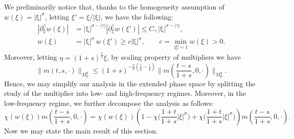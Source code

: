 \documentclass[10pt]{article}
\newcommand{\xii}{{\mathrm{|\xi|}}}
\newcommand{\<}{\langle}
\renewcommand{\>}{\rangle}
\numberwithin{equation}{section}
\begin{document}
We preliminarily notice that, thanks to the homogeneity assumption of $w(\xi) =\xii^\sigma$, letting $\xi'=\xi/\xii$, we have the following:
%
\begin{align*}
|\partial_\xi^\gamma w(\xi)| & = \xii^{\sigma-|\gamma|} |\partial_\xi^\gamma w(\xi')| \leq C_\gamma\,\xii^{\sigma-|\gamma|},\\
w(\xi) & =\xii^\sigma\,w(\xi')\geq c\xii^\sigma, \qquad c=\min_{|\xi|=1} w(\xi)>0.
\end{align*}
Moreover, letting $\eta=(1+s)^{\frac1{\sigma}}\xi$, by scaling property of  multipliers we have
\begin{equation}\label{simple}
\| m(t, s, \cdot) \|_{M_p^q} \leq (1+s)^{-\frac{n}{\sigma}\left(\frac1p-\frac1q\right)} \big\| m\left(\frac{t-s}{1+s}, 0, \cdot\right) \big\|_{M_p^q}.
\end{equation}
Hence, we may simplify our analysis in the extended phase space by splitting the study of the multiplier into low- and high-frequency regimes. Moreover, in the low-frequency regime, we further decompose the analysis as follows:
\begin{equation}\label{simple2}
\chi(w(\xi))m\left(\frac{t-s}{1+s}, 0, \cdot\right) = \chi(w(\xi))\left( 1-\chi\big(\frac{1+t}{1+s}|\xi|^{\sigma}\big)+ \chi\big(\frac{1+t}{1+s}|\xi|^{\sigma}\big) \right) m\left(\frac{t-s}{1+s}, 0, \cdot\right).
\end{equation}
Now we may state the main result of this section.
\end{document}
